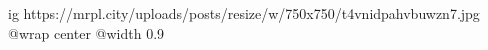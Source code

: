  
 
 
 
 

\ifcmt
  ig https://mrpl.city/uploads/posts/resize/w/750x750/t4vnidpahvbuwzn7.jpg
  @wrap center
  @width 0.9
\fi
